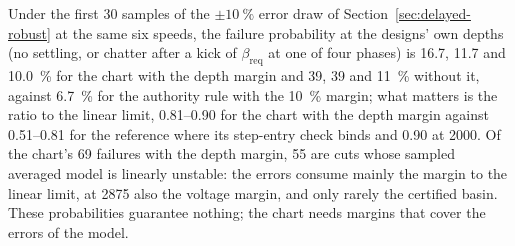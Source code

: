 Under the first 30 samples of the $\pm\SI{10}{\percent}$ error draw of Section~\ref{sec:delayed-robust} at the same six speeds, the failure probability at the designs' own depths (no settling, or chatter after a kick of $\beta_{\mathrm{req}}$ at one of four phases) is 16.7, 11.7 and \SI{10.0}{\percent} for the chart with the depth margin and 39, 39 and \SI{11}{\percent} without it, against \SI{6.7}{\percent} for the authority rule with the \SI{10}{\percent} margin; what matters is the ratio to the linear limit, 0.81--0.90 for the chart with the depth margin against 0.51--0.81 for the reference where its step-entry check binds and 0.90 at \SI{2000}{\rpm}. Of the chart's 69 failures with the depth margin, 55 are cuts whose sampled averaged model is linearly unstable: the errors consume mainly the margin to the linear limit, at \SI{2875}{\rpm} also the voltage margin, and only rarely the certified basin. These probabilities guarantee nothing; the chart needs margins that cover the errors of the model.
